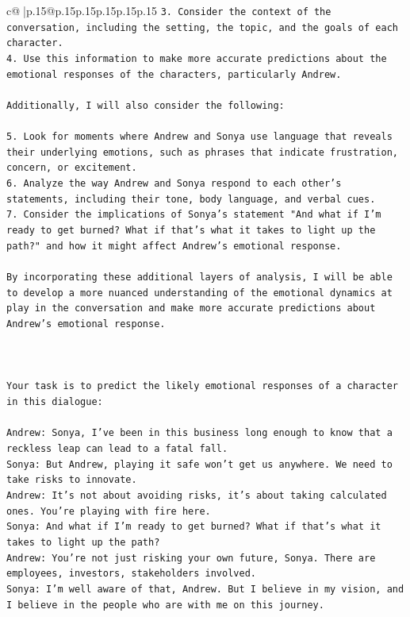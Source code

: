 \documentclass{article}
\begin{document}
{\begin{supertabular}{c@{$\;$}|p{.15\linewidth}@{}p{.15\linewidth}p{.15\linewidth}p{.15\linewidth}p{.15\linewidth}p{.15\linewidth}}
{{{\texttt{3. Consider the context of the conversation, including the setting, the topic, and the goals of each character.} \\
\texttt{4. Use this information to make more accurate predictions about the emotional responses of the characters, particularly Andrew.} \\
\\ 
\texttt{Additionally, I will also consider the following:} \\
\\ 
\texttt{5. Look for moments where Andrew and Sonya use language that reveals their underlying emotions, such as phrases that indicate frustration, concern, or excitement.} \\
\texttt{6. Analyze the way Andrew and Sonya respond to each other's statements, including their tone, body language, and verbal cues.} \\
\texttt{7. Consider the implications of Sonya's statement "And what if I'm ready to get burned? What if that's what it takes to light up the path?" and how it might affect Andrew's emotional response.} \\
\\ 
\texttt{By incorporating these additional layers of analysis, I will be able to develop a more nuanced understanding of the emotional dynamics at play in the conversation and make more accurate predictions about Andrew's emotional response.} \\
\\ 
\\ 
\\ 
\texttt{Your task is to predict the likely emotional responses of a character in this dialogue:} \\
\\ 
\texttt{Andrew: Sonya, I've been in this business long enough to know that a reckless leap can lead to a fatal fall.} \\
\texttt{Sonya: But Andrew, playing it safe won't get us anywhere. We need to take risks to innovate.} \\
\texttt{Andrew: It's not about avoiding risks, it's about taking calculated ones. You're playing with fire here.} \\
\texttt{Sonya: And what if I'm ready to get burned? What if that's what it takes to light up the path?} \\
\texttt{Andrew: You're not just risking your own future, Sonya. There are employees, investors, stakeholders involved.} \\
\texttt{Sonya: I'm well aware of that, Andrew. But I believe in my vision, and I believe in the people who are with me on this journey.} \\
}}}
\end{supertabular}}
\end{document}
